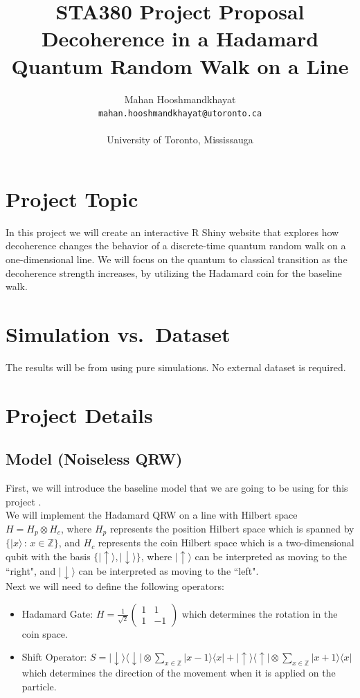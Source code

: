 \documentclass[11pt]{article}
\title{\textbf{STA380 Project Proposal}\\
Decoherence in a Hadamard Quantum Random Walk on a Line}
\author{Mahan Hooshmandkhayat \\
\small \texttt{mahan.hooshmandkhayat@utoronto.ca}\\
\\
\small University of Toronto, Mississauga 
}
\date{}
\begin{document}
\maketitle

\section{Project Topic}
In this project we will create an interactive R Shiny website that explores how decoherence changes the behavior of a
discrete-time quantum random walk on a one-dimensional line. We will focus on the quantum to classical transition as the decoherence strength increases, by utilizing the Hadamard coin for the baseline walk.

\section{Simulation vs.\ Dataset}
The results will be from using pure simulations. No external dataset is required.

\section{Project Details}
\subsection*{Model (Noiseless QRW)}
First, we will introduce the baseline model that we are going to be using for this project .\\

\noindent\noindent
We will implement the Hadamard QRW on a line with Hilbert space $H=H_p\otimes H_c$, where $H_p$ represents the position Hilbert space which is spanned by $\{|x\rangle\,:\,x\in \mathbb{Z}\}$, and $H_c$ represents the coin Hilbert space which is a two-dimensional qubit with the basis $\{|\uparrow\rangle,|\downarrow\rangle\}$, where $|\uparrow\rangle$ can be interpreted as moving to the ``right", and $|\downarrow\rangle$ can be interpreted as moving to the ``left".\\

\noindent Next we will need to define the following operators:
\begin{itemize}
    \item Hadamard Gate: $H=\frac{1}{\sqrt{2}}\begin{pmatrix}1&1\\1&-1\end{pmatrix}$ which determines the rotation in the coin space.
    \item Shift Operator: $S=|\downarrow\rangle\langle\downarrow|\otimes \sum_{x\in \mathbb{Z}} |x-1\rangle\langle x|+|\uparrow\rangle\langle\uparrow|\otimes \sum_{x\in \mathbb{Z}}|x+1\rangle\langle x|$ which determines the direction of the movement when it is applied on the particle.
\end{itemize}
\end{document}
